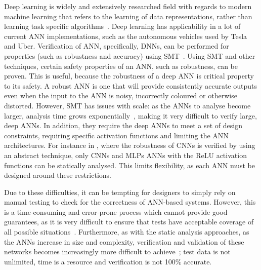 Deep learning is widely and extensively researched field with regards to modern machine learning that refers to the learning of data representations, rather than learning task specific algorithms~\cite{schmidhuber2015deep}.
Deep learning has applicability in a lot of current \ac{ANN} implementations, such as the autonomous vehicles used by Tesla and Uber.
Verification of \ac{ANN}, specifically, \acfp{DNN}, can be performed for properties (such as robustness and accuracy) using \ac{SMT}~\cite{Gehr2018AI2SA,reluplex,DeepANNverify}. 
Using \ac{SMT} and other techniques, certain safety properties of an \ac{ANN}, such as robustness, can be proven. 
This is useful, because the robustness of a deep \ac{ANN} is critical property to its safety.
A robust \ac{ANN} is one that will provide consistently accurate outputs even when the input to the \ac{ANN} is noisy, incorrectly coloured or otherwise distorted. 
However, \ac{SMT} has issues with scale: as the \acp{ANN} to analyse become larger, analysis time grows exponentially~\cite{Gehr2018AI2SA}, making it very difficult to verify large, deep \acp{ANN}.
In addition, they require the deep \acp{ANN} to meet a set of design constraints, requiring specific activation functions and limiting the \ac{ANN} architectures.
For instance in \cite{Gehr2018AI2SA}, where the robustness of \acfp{CNN} is verified by using an abstract technique, only \acp{CNN} and \acp{MLP} \acp{ANN} with the \ac{ReLU} activation functions can be statically analysed.
This limits flexibility, as each \ac{ANN} must be designed around these restrictions. %

Due to these difficulties, it can be tempting for designers to simply rely on manual testing to check for the correctness of \ac{ANN}-based systems. 
However, this is a time-consuming and error-prone process which cannot provide good guarantees, as it is very difficult to ensure that tests have acceptable coverage of all possible situations~\cite{ANN-test}.
Furthermore, as with the static analysis approaches, as the \acp{ANN} increase in size and complexity, verification and validation of these networks becomes increasingly more difficult to achieve~\cite{Gehr2018AI2SA}; test data is not unlimited, time is a resource and verification is not 100\% accurate. 

